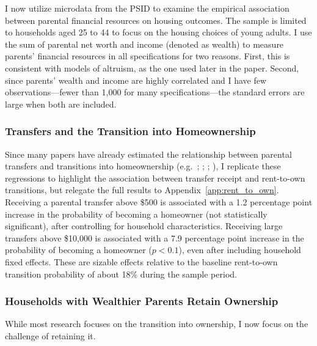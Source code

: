 \documentclass[12pt]{article}
\begin{document}
I now utilize microdata from the PSID to examine the empirical association between parental financial resources on housing outcomes. The sample is limited to households aged 25 to 44 to focus on the housing choices of young adults. I use the sum of parental net worth and income (denoted as wealth) to measure parents' financial resources in all specifications for two reasons. First, this is consistent with models of altruism, as the one used later in the paper. Second, since parents' wealth and income are highly correlated and I have few observations---fewer than 1,000 for many specifications---the standard errors are large when both are included.

\subsubsection{Transfers and the Transition into Homeownership}
Since many papers have already estimated the relationship between parental transfers and transitions into homeownership (e.g.\ \citealp{wold2024housing}; \citealp{Blickle2019}; \citealp{benetton2022dynastic}; \citealp{Lee2018}), I replicate these regressions to highlight the association between transfer receipt and rent-to-own transitions, but relegate the full results to Appendix~\ref{app:rent_to_own}. Receiving a parental transfer above \$500 is associated with a 1.2 percentage point increase in the probability of becoming a homeowner (not statistically significant), after controlling for household characteristics. Receiving large transfers above \$10,000 is associated with a 7.9 percentage point increase in the probability of becoming a homeowner ($p<0.1$), even after including household fixed effects. These are sizable effects relative to the baseline rent-to-own transition probability of about 18\% during the sample period.


\subsubsection{Households with Wealthier Parents Retain Ownership}
While most research focuses on the transition into ownership, I now focus on the challenge of retaining it.
\end{document}
